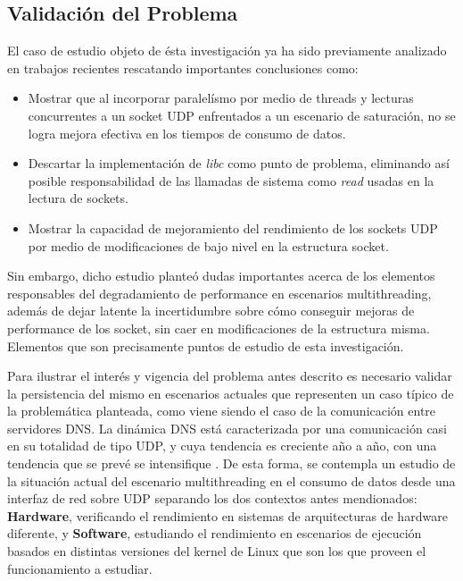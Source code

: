 \subsection{Validación del Problema}

El caso de estudio objeto de ésta investigación ya ha sido previamente analizado en trabajos recientes \cite{tesis:diegoDCC} rescatando importantes conclusiones como:
\begin{itemize}
\item Mostrar que al incorporar paralelísmo por medio de threads y lecturas concurrentes a un socket UDP enfrentados a un escenario de saturación, no se logra mejora efectiva en los tiempos de consumo de datos.
\item Descartar la implementación de \emph{libc} como punto de problema, eliminando así posible responsabilidad de las llamadas de sistema como \emph{read} usadas en la lectura de sockets.
\item Mostrar la capacidad de mejoramiento del rendimiento de los sockets UDP por medio de modificaciones de bajo nivel en la estructura socket.
\end{itemize}

Sin embargo, dicho estudio planteó dudas importantes acerca de los elementos responsables del degradamiento de performance en escenarios multithreading, además de dejar latente la incertidumbre sobre cómo conseguir mejoras de performance de los socket, sin caer en modificaciones de la estructura misma. Elementos que son precisamente puntos de estudio de esta investigación.

Para ilustrar el interés y vigencia del problema antes descrito es necesario validar la persistencia del mismo en escenarios actuales que representen un caso típico de la problemática planteada, como viene siendo el caso de la comunicación entre servidores DNS. La dinámica DNS está caracterizada por una comunicación casi en su totalidad de tipo UDP, y cuya tendencia es creciente año a año, con una tendencia que se prevé se intensifique \cite{paper:dnsRootQueries,slides:dnsRootQueries}. De esta forma, se contempla un estudio de la situación actual del escenario multithreading en el consumo de datos desde una interfaz de red sobre UDP separando los dos contextos antes mendionados: \textbf{Hardware}, verificando el rendimiento en sistemas de arquitecturas de hardware diferente, y \textbf{Software}, estudiando el rendimiento en escenarios de ejecución basados en distintas versiones del kernel de Linux que son los que proveen el funcionamiento a estudiar.

